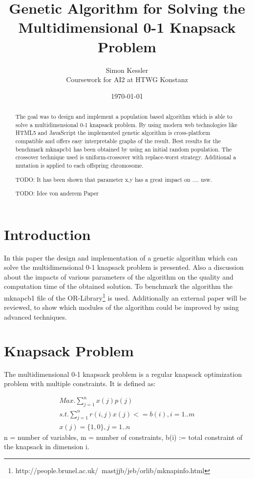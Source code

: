 \documentclass[a4paper]{article}
\title{Genetic Algorithm for Solving the Multidimensional 0-1 Knapsack Problem}
\author{Simon Kessler \\ Coursework for AI2 at HTWG Konstanz}
\date{\today}
\begin{document}
\maketitle

\begin{abstract}
The goal was to design and implement a population based algorithm which is able to solve a multidimensional 0-1 knapsack problem. By using modern web technologies like HTML5 and JavaScript the implemented genetic algorithm is cross-platform compatible and offers easy interpretable graphs of the result. Best results for the benchmark mknapcb1 has been obtained by using an initial random population. The crossover technique used is uniform-crossover with replace-worst strategy. Additional a mutation is applied to each offspring chromosome.

TODO: It has been shown that parameter x,y has a great impact on .... usw.

TODO: Idee von anderem Paper
\end{abstract}

\section{Introduction}

In this paper the design and implementation of a genetic algorithm which can solve the multidimensional 0-1 knapsack problem is presented. Also a discussion about the impacts of various parameters of the algorithm on the quality and computation time of the obtained solution. To benchmark the algorithm the mknapcb1 file of the OR-Library\footnote{http://people.brunel.ac.uk/~mastjjb/jeb/orlib/mknapinfo.html} is used. Additionally an external paper will be reviewed, to show which modules of the algorithm could be improved by using advanced techniques.

\section{Knapsack Problem}
The multidimensional 0-1 knapsack problem is a regular knapsack optimization problem with multiple constraints. It is defined as:

\begin{align}
Max. \sum_{j=1}^n x(j)p(j) \\
s.t. \sum_{j=1}^n r(i,j)x(j) <= b(i), i = 1..m \\
x(j) = \{1, 0\}, j = 1..n
\end{align}
n = number of variables, m = number of constraints, b(i) := total constraint of the knapsack in dimension i.
\end{document}
